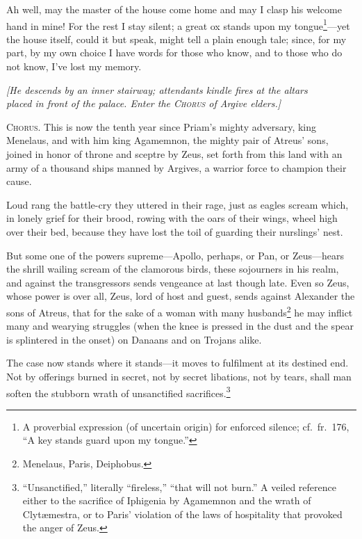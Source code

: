 \documentclass[12pt]{article}
\begin{document}
Ah well, may the master of the house come home and may I clasp his welcome hand in mine! For the rest I stay silent; a great ox stands upon my tongue\footnote{A proverbial expression (of uncertain origin) for enforced silence; cf.~fr.~176, ``A key stands guard upon my tongue.''}---yet the house itself, could it but speak, might tell a plain enough tale; since, for my part, by my own choice I have words for those who know, and to those who do not know, I've lost my memory.

\begin{center}
\textit{[He descends by an inner stairway; attendants kindle fires at the altars\\
placed in front of the palace. Enter the \textsc{Chorus} of Argive elders.]}
\end{center}

\textsc{Chorus.} This is now the tenth year since Priam's mighty adversary, king Menelaus, and with him king Agamemnon, the mighty pair of Atreus' sons, joined in honor of throne and sceptre by Zeus, set forth from this land with an army of a thousand ships manned by Argives, a warrior force to champion their cause.

Loud rang the battle-cry they uttered in their rage, just as eagles scream which, in lonely grief for their brood, rowing with the oars of their wings, wheel high over their bed, because they have lost the toil of guarding their nurslings' nest.

But some one of the powers supreme---Apollo, perhaps, or Pan, or Zeus---hears the shrill wailing scream of the clamorous birds, these sojourners in his realm, and against the transgressors sends vengeance at last though late. Even so Zeus, whose power is over all, Zeus, lord of host and guest, sends against Alexander the sons of Atreus, that for the sake of a woman with many husbands\footnote{Menelaus, Paris, Deiphobus.} he may inflict many and wearying struggles (when the knee is pressed in the dust and the spear is splintered in the onset) on Danaans and on Trojans alike.

The case now stands where it stands---it moves to fulfilment at its destined end. Not by offerings burned in secret, not by secret libations, not by tears, shall man soften the stubborn wrath of unsanctified sacrifices.\footnote{\-``Unsanctified,'' literally ``fireless,'' ``that will not burn.'' A veiled reference either to the sacrifice of Iphigenia by Agamemnon and the wrath of Clyt{\ae}mestra, or to Paris' violation of the laws of hospitality that provoked the anger of Zeus.}
\end{document}
